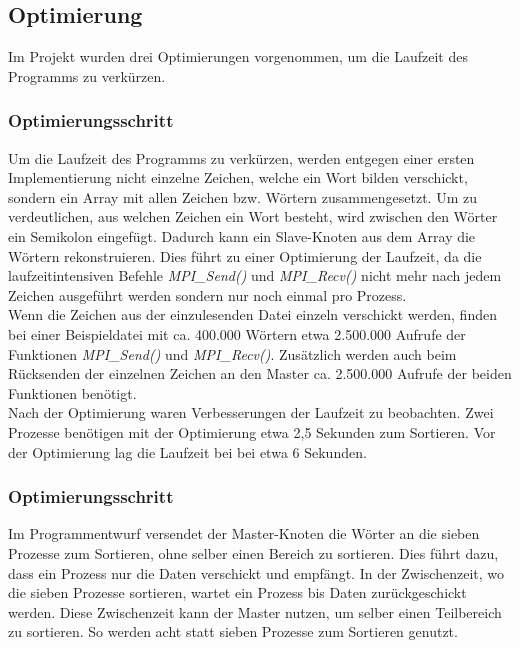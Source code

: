 \subsection{Optimierung}
Im Projekt wurden drei Optimierungen vorgenommen, um die Laufzeit des Programms zu verkürzen.\\

\subsubsection{Optimierungsschritt}
Um die Laufzeit des Programms zu verkürzen, werden entgegen einer ersten Implementierung nicht einzelne Zeichen, welche ein Wort bilden verschickt, sondern ein Array mit allen Zeichen bzw. Wörtern zusammengesetzt. Um zu verdeutlichen, aus welchen Zeichen ein Wort besteht, wird zwischen den Wörter ein Semikolon eingefügt. Dadurch kann ein Slave-Knoten aus dem Array die Wörtern rekonstruieren. Dies führt zu einer Optimierung der Laufzeit, da die laufzeitintensiven Befehle \textit{MPI\_Send()} und \textit{MPI\_Recv()} nicht mehr nach jedem Zeichen ausgeführt werden sondern nur noch einmal pro Prozess. \\
Wenn die Zeichen aus der einzulesenden Datei einzeln verschickt werden, finden bei einer Beispieldatei mit ca. 400.000 Wörtern etwa 2.500.000 Aufrufe der Funktionen \textit{MPI\_Send()} und \textit{MPI\_Recv()}. Zusätzlich werden auch beim Rücksenden der einzelnen Zeichen an den Master ca. 2.500.000 Aufrufe der beiden Funktionen benötigt.\\
Nach der Optimierung waren Verbesserungen der Laufzeit zu beobachten. Zwei Prozesse benötigen mit der Optimierung etwa 2,5 Sekunden zum Sortieren. Vor der Optimierung lag die Laufzeit bei bei etwa 6 Sekunden. 

\subsubsection{Optimierungsschritt}
Im Programmentwurf versendet der Master-Knoten die Wörter an die sieben Prozesse zum Sortieren, ohne selber einen Bereich zu sortieren. Dies führt dazu, dass ein Prozess nur die Daten verschickt und empfängt. In der Zwischenzeit, wo die sieben Prozesse sortieren, wartet ein Prozess bis Daten zurückgeschickt werden. Diese Zwischenzeit kann der Master nutzen, um selber einen Teilbereich zu sortieren. So werden acht statt sieben Prozesse zum Sortieren genutzt.  

